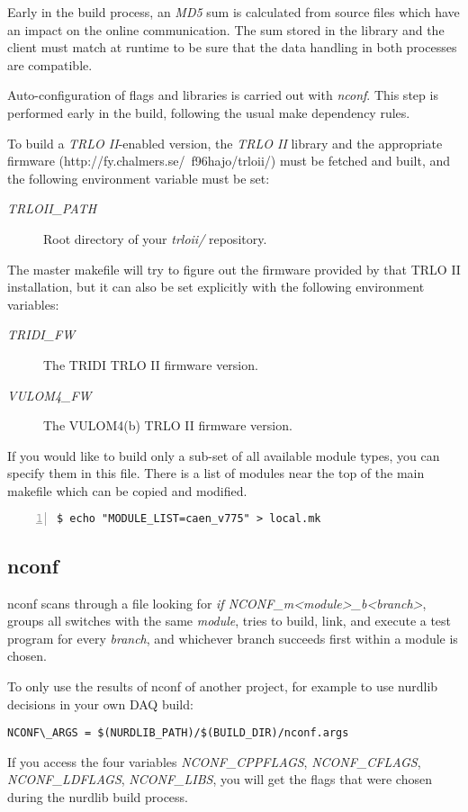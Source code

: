 \documentclass{article}
\begin{document}
Early in the build process, an \emph{MD5} sum is calculated from source files
which have an impact on the online communication. The sum stored in the
library and the client must match at runtime to be sure that the data handling
in both processes are compatible.

Auto-configuration of flags and libraries is carried out with \emph{nconf}.
This step is performed early in the build, following the usual make dependency
rules.

To build a \emph{TRLO II}-enabled version, the \emph{TRLO II} library and the
appropriate firmware (http://fy.chalmers.se/~f96hajo/trloii/) must be fetched
and built, and the following environment variable must be set:
\begin{description}
  \item[\emph{TRLOII\_PATH}] Root directory of your \emph{trloii/} repository.
\end{description}
The master makefile will try to figure out the firmware provided by that TRLO
II installation, but it can also be set explicitly with the following
environment variables:
\begin{description}
  \item[\emph{TRIDI\_FW}] The TRIDI TRLO II firmware version.
  \item[\emph{VULOM4\_FW}] The VULOM4(b) TRLO II firmware version.
\end{description}

If you would like to build only a sub-set of all available module types, you
can specify them in this file. There is a list of modules near the top of the
main makefile which can be copied and modified.
\begin{Verbatim}[frame=single,numbers=left]
$ echo "MODULE_LIST=caen_v775" > local.mk
\end{Verbatim}



\subsection{nconf}

nconf scans through a file looking for \emph{if NCONF\_m<module>\_b<branch>},
groups all switches with the same \emph{module}, tries to build, link, and
execute a test program for every \emph{branch}, and whichever branch succeeds
first within a module is chosen.

To only use the results of nconf of another project, for example to use
nurdlib decisions in your own DAQ build:
\begin{verbatim}
NCONF\_ARGS = $(NURDLIB_PATH)/$(BUILD_DIR)/nconf.args
\end{verbatim}
If you access the four variables \emph{NCONF\_CPPFLAGS}, \emph{NCONF\_CFLAGS},
\emph{NCONF\_LDFLAGS}, \emph{NCONF\_LIBS}, you will get the flags that were
chosen during the nurdlib build process.
\end{document}

